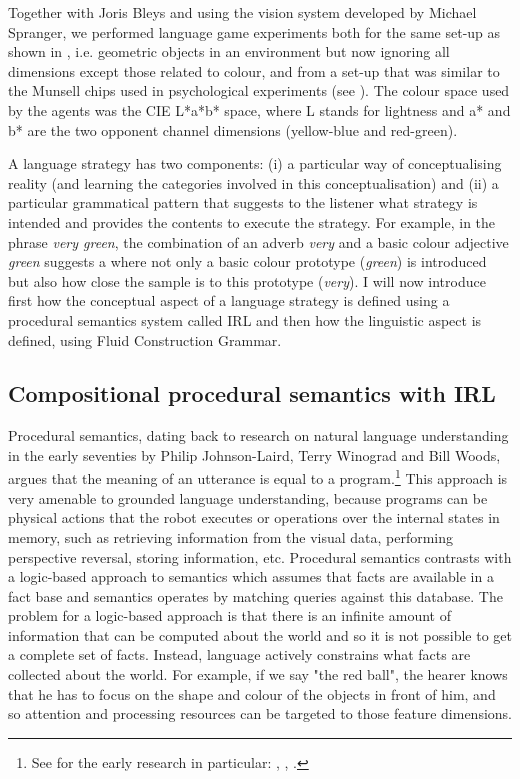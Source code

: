 Together with Joris Bleys and using the vision system developed by Michael Spranger, we 
performed language game experiments both for the same set-up as shown in , 
i.e. geometric objects in an environment but now ignoring all dimensions except those related to colour, 
and from a set-up that was similar to the Munsell chips used
in psychological experiments (see ). The colour space used by the agents was the CIE L*a*b* space, where 
L stands for lightness and a* and b* are the two opponent channel dimensions (yellow-blue and red-green). 

A language strategy has two components: (i) a particular way of conceptualising reality (and learning the categories involved
in this conceptualisation) and (ii) a particular grammatical pattern that suggests to the listener what strategy is intended 
and provides the contents to execute the strategy. For example, in the phrase \textit{very green}, the combination of an adverb 
\textit{very} and a basic colour adjective \textit{green} suggests a  where not only a basic colour prototype
(\textit{green}) is introduced but also how close the sample is to this prototype (\textit{very}). I will now introduce first how 
the conceptual aspect of a language strategy is defined using a procedural semantics system called IRL and then how the 
linguistic aspect is defined, using Fluid Construction Grammar. 

\subsection{Compositional procedural semantics with IRL}

Procedural semantics, dating back to research on natural language understanding in the 
early seventies by Philip Johnson-Laird, Terry Winograd and Bill Woods, argues that the meaning of an utterance is 
equal to a program.\footnote{See for the early research in particular: \cite{Winograd:1971}, \cite{Woods:1981}, 
\cite{Johnson-Laird:1977}.} 
This approach is very amenable to grounded language understanding, because programs can be physical 
actions that the robot executes or operations over the internal states in memory, such as retrieving information
from the visual data, performing perspective reversal, storing information, etc. Procedural semantics
contrasts with a logic-based approach to semantics which assumes that facts are available in a fact base and semantics operates
by matching queries against this database. The problem for a logic-based approach
is that there is an infinite amount of
information that can be computed about the world and so it is not possible to get a 
complete set of facts. Instead, language actively constrains what facts are collected about the world. For example, if 
we say "the red ball", the hearer knows that he has to focus on the shape and colour of the objects in front of him, 
and so attention and processing resources can be targeted to those feature dimensions. 

